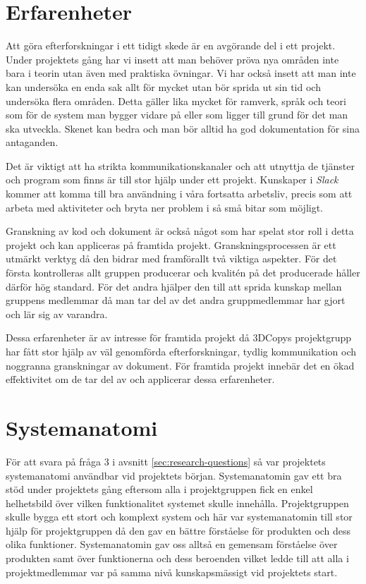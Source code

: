 \section{Erfarenheter}

Att göra efterforskningar i ett tidigt skede är en avgörande del i ett projekt. Under projektets gång har vi insett att man behöver pröva nya områden inte bara i teorin utan även med praktiska övningar. Vi har också insett att man inte kan undersöka en enda sak allt för mycket utan bör sprida ut sin tid och undersöka flera områden. Detta gäller lika mycket för ramverk, språk och teori som för de system man bygger vidare på eller som ligger till grund för det man ska utveckla. Skenet kan bedra och man bör alltid ha god dokumentation för sina antaganden.

Det är viktigt att ha strikta kommunikationskanaler och att utnyttja de tjänster och program som finns är till stor hjälp under ett projekt. Kunskaper i \textit{Slack} kommer att komma till bra användning i våra fortsatta arbetsliv, precis som att arbeta med aktiviteter och bryta ner problem i så små bitar som möjligt.

Granskning av kod och dokument är också något som har spelat stor roll i detta projekt och kan appliceras på framtida projekt. Granskningsprocessen är ett utmärkt verktyg då den bidrar med framförallt två viktiga aspekter. För det första kontrolleras allt gruppen producerar och kvalitén på det producerade håller därför hög standard. För det andra hjälper den till att sprida kunskap mellan gruppens medlemmar då man tar del av det andra gruppmedlemmar har gjort och lär sig av varandra.

Dessa erfarenheter är av intresse för framtida projekt då 3DCopys projektgrupp har fått stor hjälp av väl genomförda efterforskningar, tydlig kommunikation och noggranna granskningar av dokument. För framtida projekt innebär det en ökad effektivitet om de tar del av och applicerar dessa erfarenheter.

\section{Systemanatomi}
För att svara på fråga 3 i avsnitt \ref{sec:research-questions} så var projektets systemanatomi användbar vid projektets början. Systemanatomin gav ett bra stöd under projektets gång eftersom alla i projektgruppen fick en enkel helhetsbild över vilken funktionalitet systemet skulle innehålla. Projektgruppen skulle bygga ett stort och komplext system och här var systemanatomin till stor hjälp för projektgruppen då den gav en bättre förståelse för produkten och dess olika funktioner. Systemanatomin gav oss alltså en gemensam förståelse över produkten samt över funktionerna och dess beroenden vilket ledde till att alla i projektmedlemmar var på samma nivå kunskapsmässigt vid projektets start.

